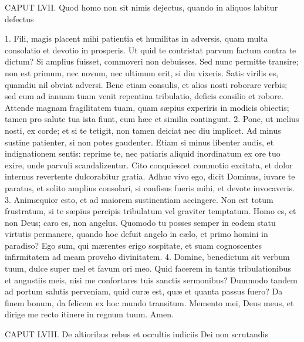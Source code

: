 \documentclass[twoside]{article}
\begin{document}
CAPUT LVII.
Quod homo non sit nimis dejectus, quando in aliquos labitur defectus

1. Fili, magis placent mihi patientia et humilitas in adversis, quam multa consolatio et devotio in prosperis. Ut quid te contristat parvum factum contra te dictum? Si amplius fuisset, commoveri non debuisses. Sed nunc permitte transire; non est primum, nec novum, nec ultimum erit, si diu vixeris. Satis virilis es, quamdiu nil obviat adversi. Bene etiam consulis, et alios nosti roborare verbis; sed cum ad ianuam tuam venit repentina tribulatio, deficis consilio et robore. Attende magnam fragilitatem tuam, quam sæpius experiris in modicis obiectis; tamen pro salute tua ista fiunt, cum hæc et similia contingunt.
2. Pone, ut melius nosti, ex corde; et si te tetigit, non tamen deiciat nec diu implicet. Ad minus sustine patienter, si non potes gaudenter. Etiam si minus libenter audis, et indignationem sentis: reprime te, nec patiaris aliquid inordinatum ex ore tuo exire, unde parvuli scandalizentur. Cito conquiescet commotio excitata, et dolor internus revertente dulcorabitur gratia. Adhuc vivo ego, dicit Dominus, iuvare te paratus, et solito amplius consolari, si confisus fueris mihi, et devote invocaveris.
3. Animæquior esto, et ad maiorem sustinentiam accingere. Non est totum frustratum, si te sæpius percipis tribulatum vel graviter temptatum. Homo es, et non Deus; caro es, non angelus. Quomodo tu posses semper in eodem statu virtutis permanere, quando hoc defuit angelo in cælo, et primo homini in paradiso? Ego sum, qui mærentes erigo sospitate, et suam cognoscentes infirmitatem ad meam proveho divinitatem.
4. Domine, benedictum sit verbum tuum, dulce super mel et favum ori meo. Quid facerem in tantis tribulationibus et angustiis meis, nisi me confortares tuis sanctis sermonibus? Dummodo tandem ad portum salutis perveniam, quid curæ est, quæ et quanta passus fuero? Da finem bonum, da felicem ex hoc mundo transitum. Memento mei, Deus meus, et dirige me recto itinere in regnum tuum. Amen.


CAPUT LVIII.
De altioribus rebus et occultis iudiciis Dei non scrutandis
\end{document}
